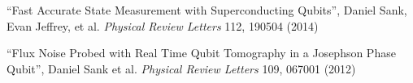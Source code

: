 \item ``Fast Accurate State Measurement with Superconducting Qubits'', Daniel Sank, Evan Jeffrey, et al. \emph{Physical Review Letters} 112, 190504 (2014)
\item ``Flux Noise Probed with Real Time Qubit Tomography in a Josephson Phase Qubit'', Daniel Sank et al. \emph{Physical Review Letters} 109, 067001 (2012)
